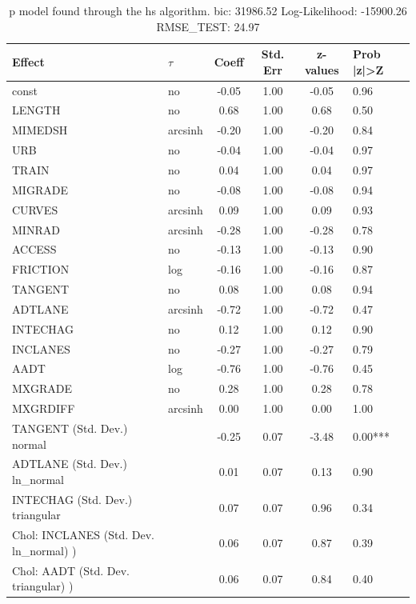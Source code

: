 \begin{table}
	\caption{p model found through the hs algorithm. bic: 31986.52 Log-Likelihood: -15900.26 RMSE_TEST: 24.97}
	\begin{center}
		\begin{tabular}{|l|l|c|c|c|l|}
			\hline
			Effect & $\tau$ & Coeff & Std. Err & z-values & Prob |z|>Z \\
			\hline
			const & no & -0.05 & 1.00 & -0.05 & 0.96 \\
			\hline
			LENGTH & no & 0.68 & 1.00 & 0.68 & 0.50 \\
			\hline
			MIMEDSH & arcsinh & -0.20 & 1.00 & -0.20 & 0.84 \\
			\hline
			URB & no & -0.04 & 1.00 & -0.04 & 0.97 \\
			\hline
			TRAIN & no & 0.04 & 1.00 & 0.04 & 0.97 \\
			\hline
			MIGRADE & no & -0.08 & 1.00 & -0.08 & 0.94 \\
			\hline
			CURVES & arcsinh & 0.09 & 1.00 & 0.09 & 0.93 \\
			\hline
			MINRAD & arcsinh & -0.28 & 1.00 & -0.28 & 0.78 \\
			\hline
			ACCESS & no & -0.13 & 1.00 & -0.13 & 0.90 \\
			\hline
			FRICTION & log & -0.16 & 1.00 & -0.16 & 0.87 \\
			\hline
			TANGENT & no & 0.08 & 1.00 & 0.08 & 0.94 \\
			\hline
			ADTLANE & arcsinh & -0.72 & 1.00 & -0.72 & 0.47 \\
			\hline
			INTECHAG & no & 0.12 & 1.00 & 0.12 & 0.90 \\
			\hline
			INCLANES & no & -0.27 & 1.00 & -0.27 & 0.79 \\
			\hline
			AADT & log & -0.76 & 1.00 & -0.76 & 0.45 \\
			\hline
			MXGRADE & no & 0.28 & 1.00 & 0.28 & 0.78 \\
			\hline
			MXGRDIFF & arcsinh & 0.00 & 1.00 & 0.00 & 1.00 \\
			\hline
			TANGENT (Std. Dev.) normal &  & -0.25 & 0.07 & -3.48 & 0.00*** \\
			\hline
			ADTLANE (Std. Dev.) ln_normal &  & 0.01 & 0.07 & 0.13 & 0.90 \\
			\hline
			INTECHAG (Std. Dev.) triangular &  & 0.07 & 0.07 & 0.96 & 0.34 \\
			\hline
			 Chol: INCLANES (Std. Dev. ln_normal) ) &  & 0.06 & 0.07 & 0.87 & 0.39 \\
			\hline
			 Chol: AADT (Std. Dev. triangular) ) &  & 0.06 & 0.07 & 0.84 & 0.40 \\

\end{tabular}
\end{center}
\end{table}
